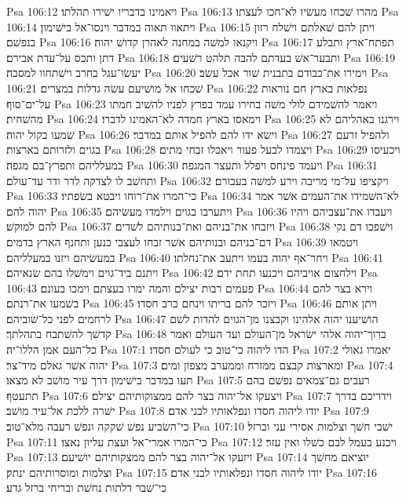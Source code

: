 Psa 106:12  ויאמינו בדבריו ישׁירו תהלתו׃
Psa 106:13  מהרו שׁכחו מעשׂיו לא־חכו לעצתו׃
Psa 106:14  ויתאוו תאוה במדבר וינסו־אל בישׁימון׃
Psa 106:15  ויתן להם שׁאלתם וישׁלח רזון בנפשׁם׃
Psa 106:16  ויקנאו למשׁה במחנה לאהרן קדושׁ יהוה׃
Psa 106:17  תפתח־ארץ ותבלע דתן ותכס על־עדת אבירם׃
Psa 106:18  ותבער־אשׁ בעדתם להבה תלהט רשׁעים׃
Psa 106:19  יעשׂו־עגל בחרב וישׁתחוו למסכה׃
Psa 106:20  וימירו את־כבודם בתבנית שׁור אכל עשׂב׃
Psa 106:21  שׁכחו אל מושׁיעם עשׂה גדלות במצרים׃
Psa 106:22  נפלאות בארץ חם נוראות על־ים־סוף׃
Psa 106:23  ויאמר להשׁמידם לולי משׁה בחירו עמד בפרץ לפניו להשׁיב חמתו מהשׁחית׃
Psa 106:24  וימאסו בארץ חמדה לא־האמינו לדברו׃
Psa 106:25  וירגנו באהליהם לא שׁמעו בקול יהוה׃
Psa 106:26  וישׂא ידו להם להפיל אותם במדבר׃
Psa 106:27  ולהפיל זרעם בגוים ולזרותם בארצות׃
Psa 106:28  ויצמדו לבעל פעור ויאכלו זבחי מתים׃
Psa 106:29  ויכעיסו במעלליהם ותפרץ־בם מגפה׃
Psa 106:30  ויעמד פינחס ויפלל ותעצר המגפה׃
Psa 106:31  ותחשׁב לו לצדקה לדר ודר עד־עולם׃
Psa 106:32  ויקציפו על־מי מריבה וירע למשׁה בעבורם׃
Psa 106:33  כי־המרו את־רוחו ויבטא בשׂפתיו׃
Psa 106:34  לא־השׁמידו את־העמים אשׁר אמר יהוה להם׃
Psa 106:35  ויתערבו בגוים וילמדו מעשׂיהם׃
Psa 106:36  ויעבדו את־עצביהם ויהיו להם למוקשׁ׃
Psa 106:37  ויזבחו את־בניהם ואת־בנותיהם לשׁדים׃
Psa 106:38  וישׁפכו דם נקי דם־בניהם ובנותיהם אשׁר זבחו לעצבי כנען ותחנף הארץ בדמים׃
Psa 106:39  ויטמאו במעשׂיהם ויזנו במעלליהם׃
Psa 106:40  ויחר־אף יהוה בעמו ויתעב את־נחלתו׃
Psa 106:41  ויתנם ביד־גוים וימשׁלו בהם שׂנאיהם׃
Psa 106:42  וילחצום אויביהם ויכנעו תחת ידם׃
Psa 106:43  פעמים רבות יצילם והמה ימרו בעצתם וימכו בעונם׃
Psa 106:44  וירא בצר להם בשׁמעו את־רנתם׃
Psa 106:45  ויזכר להם בריתו וינחם כרב חסדו׃
Psa 106:46  ויתן אותם לרחמים לפני כל־שׁוביהם׃
Psa 106:47  הושׁיענו יהוה אלהינו וקבצנו מן־הגוים להדות לשׁם קדשׁך להשׁתבח בתהלתך׃
Psa 106:48  ברוך־יהוה אלהי ישׂראל מן־העולם ועד העולם ואמר כל־העם אמן הללו־יה׃
Psa 107:1  הדו ליהוה כי־טוב כי לעולם חסדו׃
Psa 107:2  יאמרו גאולי יהוה אשׁר גאלם מיד־צר׃
Psa 107:3  ומארצות קבצם ממזרח וממערב מצפון ומים׃
Psa 107:4  תעו במדבר בישׁימון דרך עיר מושׁב לא מצאו׃
Psa 107:5  רעבים גם־צמאים נפשׁם בהם תתעטף׃
Psa 107:6  ויצעקו אל־יהוה בצר להם ממצוקותיהם יצילם׃
Psa 107:7  וידריכם בדרך ישׁרה ללכת אל־עיר מושׁב׃
Psa 107:8  יודו ליהוה חסדו ונפלאותיו לבני אדם׃
Psa 107:9  כי־השׂביע נפשׁ שׁקקה ונפשׁ רעבה מלא־טוב׃
Psa 107:10  ישׁבי חשׁך וצלמות אסירי עני וברזל׃
Psa 107:11  כי־המרו אמרי־אל ועצת עליון נאצו׃
Psa 107:12  ויכנע בעמל לבם כשׁלו ואין עזר׃
Psa 107:13  ויזעקו אל־יהוה בצר להם ממצקותיהם יושׁיעם׃
Psa 107:14  יוציאם מחשׁך וצלמות ומוסרותיהם ינתק׃
Psa 107:15  יודו ליהוה חסדו ונפלאותיו לבני אדם׃
Psa 107:16  כי־שׁבר דלתות נחשׁת ובריחי ברזל גדע׃
